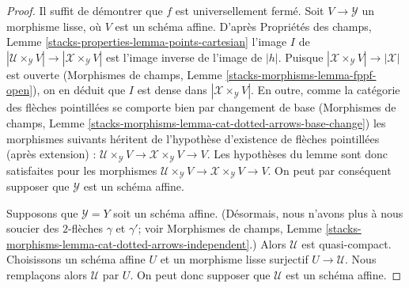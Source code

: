 \begin{proof}
Il suffit de démontrer que $f$ est universellement fermé.
Soit $V \to \mathcal{Y}$ un morphisme lisse, où $V$ est un schéma affine.
D'après Propriétés des champs, Lemme
\ref{stacks-properties-lemma-points-cartesian}
l'image $I$ de
$|\mathcal{U} \times_\mathcal{Y} V| \to |\mathcal{X} \times_\mathcal{Y} V|$
est l'image inverse de l'image de $|h|$. Puisque
$|\mathcal{X} \times_\mathcal{Y} V| \to |\mathcal{X}|$ est ouverte
(Morphismes de champs, Lemme \ref{stacks-morphisms-lemma-fppf-open}),
on en déduit que $I$ est dense dans $|\mathcal{X} \times_\mathcal{Y} V|$.
En outre, comme la catégorie des flèches pointillées se comporte bien par
changement de base (Morphismes de champs, Lemme
\ref{stacks-morphisms-lemma-cat-dotted-arrows-base-change})
les morphismes suivants héritent de l'hypothèse d'existence de flèches pointillées
(après extension) :
$\mathcal{U} \times_\mathcal{Y} V \to \mathcal{X} \times_\mathcal{Y} V \to V$.
Les hypothèses du lemme sont donc
satisfaites pour les morphismes
$\mathcal{U} \times_\mathcal{Y} V \to \mathcal{X} \times_\mathcal{Y} V \to V$.
On peut par conséquent supposer que $\mathcal{Y}$ est un schéma affine.

\medskip\noindent
Supposons que $\mathcal{Y} = Y$ soit un schéma affine.
(Désormais, nous n'avons plus à nous soucier des
$2$-flèches $\gamma$ et $\gamma'$; voir Morphismes de champs, Lemme
\ref{stacks-morphisms-lemma-cat-dotted-arrows-independent}.)
Alors $\mathcal{U}$ est quasi-compact. Choisissons un schéma affine $U$ et un
morphisme lisse surjectif $U \to \mathcal{U}$.
Nous remplaçons alors $\mathcal{U}$ par $U$.
On peut donc supposer que $\mathcal{U}$ est un schéma affine.


\end{proof}
